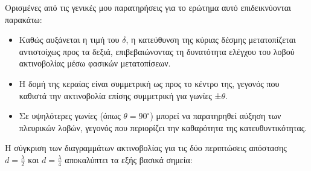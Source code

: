 \documentclass[a4paper,12pt]{report}
\begin{document}
Ορισμένες από τις γενικές μου παρατηρήσεις για το ερώτημα αυτό επιδεικνύονται παρακάτω:

\begin{itemize}
    \item Καθώς αυξάνεται η τιμή του \(\delta\), η κατεύθυνση της κύριας δέσμης μετατοπίζεται αντιστοίχως προς τα δεξιά, επιβεβαιώνοντας τη δυνατότητα ελέγχου του λοβού ακτινοβολίας μέσω φασικών μετατοπίσεων.
    \item Η δομή της κεραίας είναι συμμετρική ως προς το κέντρο της, γεγονός που καθιστά την ακτινοβολία επίσης συμμετρική για γωνίες ±\(\theta\).
    \item Σε υψηλότερες γωνίες (όπως \( \theta = 90^\circ \)) μπορεί να παρατηρηθεί αύξηση των πλευρικών λοβών, γεγονός που περιορίζει την καθαρότητα της κατευθυντικότητας.
\end{itemize}

\hspace{-0.6cm}Η σύγκριση των διαγραμμάτων ακτινοβολίας για τις δύο περιπτώσεις απόστασης \( d = \frac{\lambda}{2} \) και \( d = \frac{\lambda}{4} \) αποκαλύπτει τα εξής βασικά σημεία:
\end{document}
